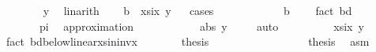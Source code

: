 \begin{isabellebody}
\ \ \ \ \isamarkupfalse%
\ {\isacartoucheopen}{}\ {\isasymle}\ y{\isacartoucheclose}\ \isamarkupfalse%
\ linarith\isanewline
\ \ \isamarkupfalse%
\ {\isachardoublequoteopen}b\ {\isasymle}\ xsix\ y{\isachardoublequoteclose}\isanewline
\ \ \isamarkupfalse%
{\isacharparenleft}{\kern0pt}cases{\isacharparenright}{\kern0pt}\isanewline
\ \ \ \ \isamarkupfalse%
\ {}\isanewline
\ \ \ \ \isamarkupfalse%
\ {\isachardoublequoteopen}b\ {\isasymle}\ {\isacharminus}{\kern0pt}{}{\isachardot}{\kern0pt}{}{}{}{\isachardoublequoteclose}\ \isamarkupfalse%
\ {\isacharparenleft}{\kern0pt}fact\ bd{\isacharparenright}{\kern0pt}\isanewline
\ \ \ \ \isamarkupfalse%
\ \isamarkupfalse%
\ {\isachardoublequoteopen}{\isasymdots}\ {\isasymle}\ {\isacharminus}{\kern0pt}{}\ {\isacharslash}{\kern0pt}\ {\isacharparenleft}{\kern0pt}{}\ {\isacharasterisk}{\kern0pt}\ pi{\isacharparenright}{\kern0pt}{\isachardoublequoteclose}\ \isamarkupfalse%
\ {\isacharparenleft}{\kern0pt}approximation\ {}{\isacharparenright}{\kern0pt}\isanewline
\ \ \ \ \isamarkupfalse%
\ \isamarkupfalse%
\ {\isachardoublequoteopen}{\isasymdots}\ {\isasymle}\ {\isacharminus}{\kern0pt}\ abs\ y{\isachardoublequoteclose}\ \isamarkupfalse%
\ {}\ \isamarkupfalse%
\ auto\isanewline
\ \ \ \ \isamarkupfalse%
\ \isamarkupfalse%
\ {\isachardoublequoteopen}{\isasymdots}\ {\isasymle}\ xsix\ y{\isachardoublequoteclose}\ \isamarkupfalse%
\ {\isacharparenleft}{\kern0pt}fact\ bd{\isacharunderscore}{\kern0pt}below{\isacharunderscore}{\kern0pt}linear{\isacharunderscore}{\kern0pt}xsininvx{\isacharparenright}{\kern0pt}\isanewline
\ \ \ \ \isamarkupfalse%
\ \isamarkupfalse%
\ {\isacharquery}{\kern0pt}thesis\ \isakeywordONE{{\isachardot}{\kern0pt}}\isamarkupfalse%
\isanewline
\ \ \isamarkupfalse%
\isanewline
\ \ \ \ \isamarkupfalse%
\ {}\isanewline
\ \ \ \ \isamarkupfalse%
\ \isamarkupfalse%
\ {\isacharquery}{\kern0pt}thesis\ \isamarkupfalse%
\ asm{\isacharparenleft}{\kern0pt}{}{\isacharparenright}{\kern0pt}\ \isamarkupfalse%

\end{isabellebody}

